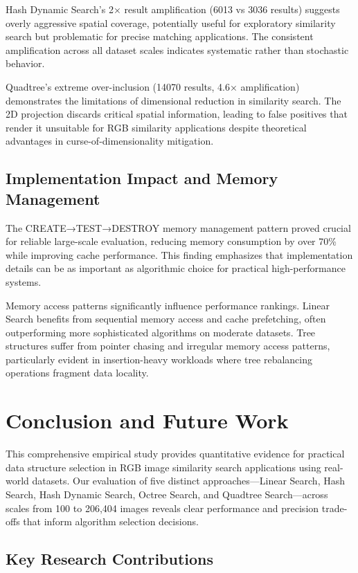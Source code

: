 \documentclass{sbc2023}
\begin{document}
Hash Dynamic Search's 2× result amplification (6013 vs 3036 results) suggests overly aggressive spatial coverage, potentially useful for exploratory similarity search but problematic for precise matching applications. The consistent amplification across all dataset scales indicates systematic rather than stochastic behavior.

Quadtree's extreme over-inclusion (14070 results, 4.6× amplification) demonstrates the limitations of dimensional reduction in similarity search. The 2D projection discards critical spatial information, leading to false positives that render it unsuitable for RGB similarity applications despite theoretical advantages in curse-of-dimensionality mitigation.

\subsection{Implementation Impact and Memory Management}

The CREATE→TEST→DESTROY memory management pattern proved crucial for reliable large-scale evaluation, reducing memory consumption by over 70\% while improving cache performance. This finding emphasizes that implementation details can be as important as algorithmic choice for practical high-performance systems.

Memory access patterns significantly influence performance rankings. Linear Search benefits from sequential memory access and cache prefetching, often outperforming more sophisticated algorithms on moderate datasets. Tree structures suffer from pointer chasing and irregular memory access patterns, particularly evident in insertion-heavy workloads where tree rebalancing operations fragment data locality.

\section{Conclusion and Future Work}
\label{sec:conclusion}

This comprehensive empirical study provides quantitative evidence for practical data structure selection in RGB image similarity search applications using real-world datasets. Our evaluation of five distinct approaches—Linear Search, Hash Search, Hash Dynamic Search, Octree Search, and Quadtree Search—across scales from 100 to 206,404 images reveals clear performance and precision trade-offs that inform algorithm selection decisions.

\subsection{Key Research Contributions}
\end{document}
